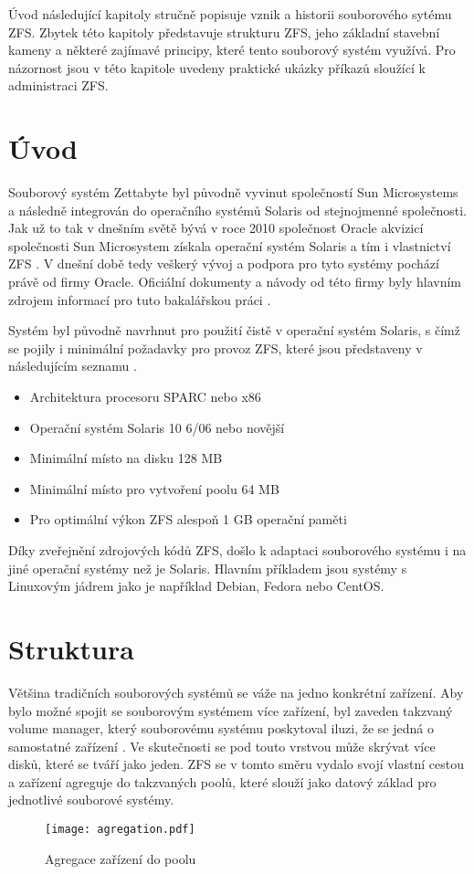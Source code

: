 Úvod následující kapitoly stručně popisuje vznik a historii souborového sytému ZFS. Zbytek této kapitoly představuje strukturu ZFS, jeho základní stavební kameny a některé zajímavé principy, které tento souborový systém využívá. Pro názornost jsou v této kapitole uvedeny praktické ukázky příkazů sloužící k administraci ZFS.

\section{Úvod}
    Souborový systém Zettabyte byl původně vyvinut společností Sun Microsystems a následně integrován do operačního systémů Solaris od stejnojmenné společnosti.
    Jak už to tak v dnešním světě bývá v roce 2010 společnost Oracle akvizicí společnosti Sun Microsystem získala operační systém Solaris a tím i vlastnictví ZFS \cite{suns}. V dnešní době tedy veškerý vývoj a podpora pro tyto systémy pochází právě od firmy Oracle. Oficiální dokumenty a návody od této firmy byly hlavním zdrojem informací pro tuto bakalářskou práci \cite{guide}.

    Systém byl původně navrhnut pro použití čistě v operační systém Solaris, s čímž se pojily i minimální požadavky pro provoz ZFS, které jsou představeny v následujícím seznamu \cite{requirements}.
    \begin{itemize}
      \item Architektura procesoru SPARC nebo x86
      \item Operační systém Solaris 10 6/06 nebo novější
      \item Minimální místo na disku 128 MB
      \item Minimální místo pro vytvoření poolu 64 MB
      \item Pro optimální výkon ZFS alespoň 1 GB operační paměti
    \end{itemize}

    Díky zveřejnění zdrojových kódů ZFS, došlo k adaptaci souborového systému i na jiné operační systémy než je Solaris. Hlavním příkladem jsou systémy s Linuxovým jádrem jako je například Debian, Fedora nebo CentOS.

\section{Struktura}
Většina tradičních souborových systémů se váže na jedno konkrétní zařízení. Aby bylo možné spojit se souborovým systémem více zařízení, byl zaveden takzvaný volume manager, který souborovému systému poskytoval iluzi, že se jedná o samostatné zařízení \cite{traditional}. Ve skutečnosti se pod touto vrstvou může skrývat více disků, které se tváří jako jeden. ZFS se v tomto směru vydalo svojí vlastní cestou a zařízení agreguje do takzvaných poolů, které slouží jako datový základ pro jednotlivé souborové systémy.
\begin{figure}[!h]
    \caption{Agregace zařízení do poolu}
    \label{agregation}
    \centering
    \texttt{[image: agregation.pdf]}
\end{figure}
